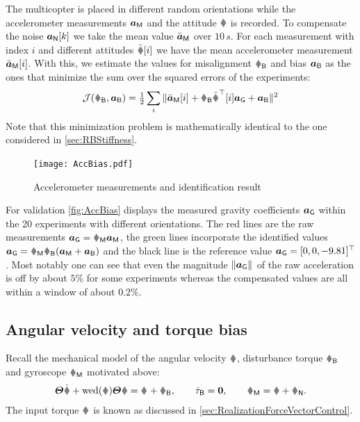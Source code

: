The multicopter is placed in different random orientations while the accelerometer measurements $\boldsymbol{a}_{\mathsf{M}}$ and the attitude $\R$ is recorded.
To compensate the noise $\boldsymbol{a}_{\mathsf{N}}[k]$ we take the mean value $\bar{\boldsymbol{a}}_{\mathsf{M}}$ over $10\,\unit{s}$.
For each measurement with index $i$ and different attitudes $\bar{\R}[i]$ we have the mean accelerometer measurement $\bar{\boldsymbol{a}}_{\mathsf{M}}[i]$.
With this, we estimate the values for misalignment $\RIMUBR$ and bias $\boldsymbol{a}_{\mathsf{B}}$ as the ones that minimize the sum over the squared errors of the experiments:
\begin{align}
 \mathcal{J}(\RIMUBR, \aIMUB) = \tfrac{1}{2} \sum_i \norm{ \bar{\tuple{a}}_{\idxText{M}}[i] + \RIMUBR \bar{\R}^\top[i] \gravityAcc + \aIMUB }^2
\end{align}
Note that this minimization problem is mathematically identical to the one considered in \autoref{sec:RBStiffness}.

\begin{figure}[htb]
 \centering
 \texttt{[image: AccBias.pdf]}
 \caption{Accelerometer measurements and identification result}
 \label{fig:AccBias}
\end{figure}

For validation \autoref{fig:AccBias} displays the measured gravity coefficients $\boldsymbol{a}_{\mathsf{G}}$ within the 20 experiments with different orientations.
The red lines are the raw measurements $\gravityAcc = \RVIC \aIMU$, the green lines incorporate the identified values $\gravityAcc = \RVIC \RIMUBR (\aIMU + \aIMUB)$ and the black line is the reference value $\boldsymbol{a}_{\mathsf{G}} = [0,0,-9.81]^\top$.
Most notably one can see that even the magnitude $\| \boldsymbol{a}_{\mathsf{G}} \|_{}$ of the raw acceleration is off by about $5\%$ for some experiments whereas the compensated values are all within a window of about $0.2\%$.

\subsection{Angular velocity and torque bias}
Recall the mechanical model of the angular velocity $\w$, disturbance torque $\tauB$ and gyroscope $\wIMU$ motivated above:
\begin{align}
 \J \dot{\w} + \wedOp(\w) \J \w = \bodyTorque{}{} + \tauB,
\qquad
 \dot{\tau}_{\textsf{B}} = \tuple{0},
\qquad
 \wIMU = \w + \wIMUN.
\end{align}
The input torque $\bodyTorque{}{}$ is known as discussed in \autoref{sec:RealizationForceVectorControl}.

